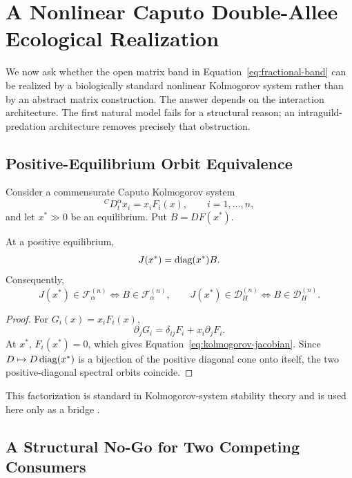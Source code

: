 \section{A Nonlinear Caputo Double-Allee Ecological Realization}\label{sec:ecology}

We now ask whether the open matrix band in Equation~\eqref{eq:fractional-band} can be realized by a biologically standard nonlinear Kolmogorov system rather than by an abstract matrix construction. The answer depends on the interaction architecture. The first natural model fails for a structural reason; an intraguild-predation architecture removes precisely that obstruction.

\subsection{Positive-Equilibrium Orbit Equivalence}

Consider a commensurate Caputo Kolmogorov system
\begin{equation}
 {}^C D_t^\alpha x_i=x_iF_i(x),\qquad i=1,\dots,n,
 \label{eq:kolmogorov-general}
\end{equation}
and let \(x^*\gg0\) be an equilibrium. Put \(B=DF(x^*)\).

\begin{Lemma}\label{lem:kolmogorov-orbit}
At a positive equilibrium,
\begin{equation}
 J(x^*)=\operatorname{diag}(x^*)B.
 \label{eq:kolmogorov-jacobian}
\end{equation}
Consequently,
\[
 J(x^*)\in\mathcal F_\alpha^{(n)}
 \iff
 B\in\mathcal F_\alpha^{(n)},
 \qquad
 J(x^*)\in\mathcal D_H^{(n)}
 \iff
 B\in\mathcal D_H^{(n)}.
\]
\end{Lemma}

\begin{proof}
For \(G_i(x)=x_iF_i(x)\),
\[
 \partial_jG_i
 =
 \delta_{ij}F_i+x_i\partial_jF_i.
\]
At \(x^*\), \(F_i(x^*)=0\), which gives Equation~\eqref{eq:kolmogorov-jacobian}. Since \(D\mapsto D\operatorname{diag}(x^*)\) is a bijection of the positive diagonal cone onto itself, the two positive-diagonal spectral orbits coincide.
\end{proof}

This factorization is standard in Kolmogorov-system stability theory and is used here only as a bridge \cite{HouBaigent2015,ChenWangLiu2024}.

\subsection{A Structural No-Go for Two Competing Consumers}

